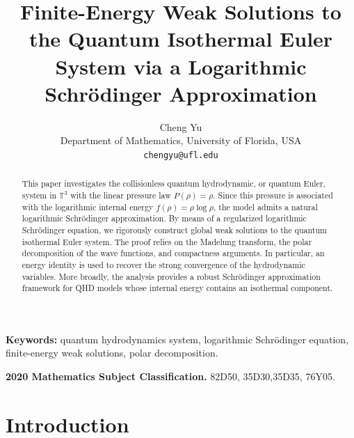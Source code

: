 \documentclass[11pt]{article}
\title{Finite-Energy Weak Solutions to the Quantum Isothermal Euler System via a Logarithmic Schr\"odinger Approximation}
\author{Cheng Yu\\
Department of Mathematics, University of Florida, USA\\
\texttt{chengyu@ufl.edu}}
\date{}
\begin{document}
\maketitle
\begin{abstract}
This paper investigates the collisionless quantum hydrodynamic, or quantum Euler, system in \(\mathbb{T}^3\) with the linear pressure law \(P(\rho)=\rho\). Since this pressure is associated with the logarithmic internal energy \(f(\rho)=\rho\log\rho\), the model admits a natural logarithmic Schr\"odinger approximation. By means of a regularized logarithmic Schr\"odinger equation, we rigorously construct global weak solutions to the quantum isothermal Euler system. The proof relies on the Madelung transform, the polar decomposition of the wave functions, and compactness arguments. In particular, an energy  identity is used to recover the strong convergence of the hydrodynamic variables. More broadly, the analysis provides a robust Schr\"odinger approximation framework for QHD models whose internal energy contains an isothermal component.
\end{abstract}

\medskip
\noindent\textbf{Keywords:}
quantum hydrodynamics system,  logarithmic Schr\"odinger equation, finite-energy weak solutions, polar decomposition.
\newline

\noindent \textbf{2020 Mathematics Subject Classification.}
82D50, 35D30,35D35, 76Y05.


\medskip










\section{Introduction}
\end{document}
